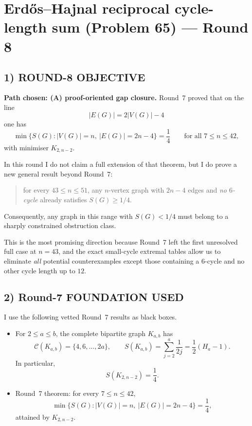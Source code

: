 \section{Erd\H{o}s--Hajnal reciprocal cycle-length sum (Problem 65) --- Round 8}

\subsection*{1) ROUND-8 OBJECTIVE}

\textbf{Path chosen: (A) proof-oriented gap closure.}
Round~7 proved that on the line
\[
|E(G)|=2|V(G)|-4
\]
one has
\[
\min\{S(G): |V(G)|=n,\ |E(G)|=2n-4\}=\frac14
\qquad\text{for all }7\le n\le 42,
\]
with minimiser $K_{2,n-2}$.

In this round I do not claim a full extension of that theorem, but I do prove a new general result beyond Round~7:
\begin{quote}
for every $43\le n\le 51$, any $n$-vertex graph with $2n-4$ edges and \emph{no $6$-cycle} already satisfies $S(G)\ge 1/4$.
\end{quote}
Consequently, any graph in this range with $S(G)<1/4$ must belong to a sharply constrained obstruction class.

This is the most promising direction because Round~7 left the first unresolved full case at $n=43$, and the exact small-cycle extremal tables allow us to eliminate \emph{all} potential counterexamples except those containing a $6$-cycle and no other cycle length up to $12$.

\subsection*{2) Round-7 FOUNDATION USED}

I use the following vetted Round~7 results as black boxes.

\begin{itemize}
\item[(F1)] For $2\le a\le b$, the complete bipartite graph $K_{a,b}$ has
\[
\mathcal C(K_{a,b})=\{4,6,\dots,2a\},
\qquad
S(K_{a,b})=\sum_{j=2}^{a}\frac1{2j}=\frac12(H_a-1).
\]
In particular,
\[
S(K_{2,n-2})=\frac14.
\]

\item[(F2)] Round~7 theorem: for every $7\le n\le 42$,
\[
\min\{S(G): |V(G)|=n,\ |E(G)|=2n-4\}=\frac14,
\]
attained by $K_{2,n-2}$.
\end{itemize}

